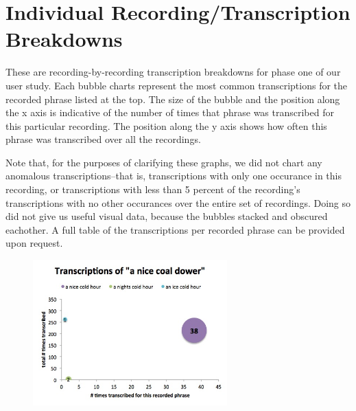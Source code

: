 \label{phaseOneBubbleCharts}
\section{Individual Recording/Transcription Breakdowns}
These are recording-by-recording transcription breakdowns for phase one of our user study. Each bubble charts represent the most common transcriptions for the recorded phrase listed at the top. The size of the bubble and the position along the x axis is indicative of the number of times that phrase was transcribed for this particular recording.  The position along the y axis shows how often this phrase was transcribed over all the recordings.

Note that, for the purposes of clarifying these graphs, we did not chart any anomalous transcriptions--that is, transcriptions with only one occurance in this recording, or transcriptions with less than 5 percent of the recording's transcriptions with no other occurances over the entire set of recordings.  Doing so did not give us useful visual data, because the bubbles stacked and obscured eachother.  A full table of the transcriptions per recorded phrase can be provided upon request.





\def \piechartwidth { 75mm }

\begin{figure}[h]
\begin{center}
\includegraphics[width=\piechartwidth]{bubbleChartTranscriptionFrequency_aNiceCoalDower.jpg}
\captionfonts
\caption[Most common transcriptions for the recorded phrase "a nice coal dower"]{}
\label{bubbleChart:aNiceCoalDower}
\end{center}
\end{figure}


